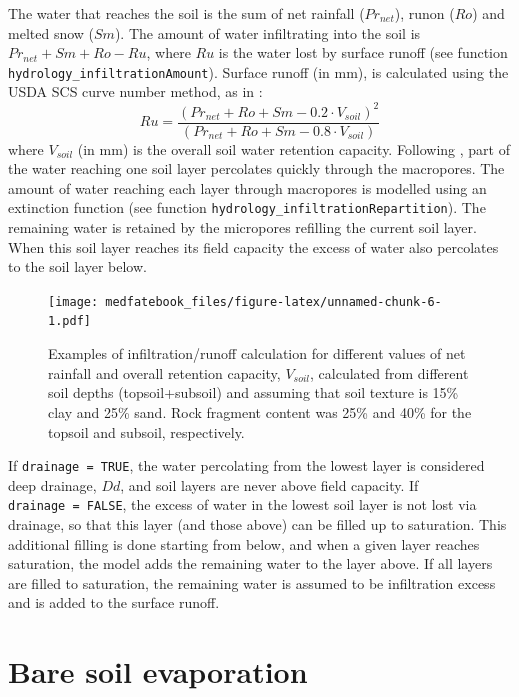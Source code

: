 \documentclass[]{book}
\begin{document}
The water that reaches the soil is the sum of net rainfall (\(Pr_{net}\)), runon (\(Ro\)) and melted snow (\(Sm\)). The amount of water infiltrating into the soil is \(Pr_{net} + Sm + Ro - Ru\), where \(Ru\) is the water lost by surface runoff (see function \texttt{hydrology\_infiltrationAmount}). Surface runoff (in mm), is calculated using the USDA SCS curve number method, as in \citet{Boughton1989}:
\begin{equation}
Ru=\frac{(Pr_{net} + Ro + Sm - 0.2 \cdot V_{soil})^2}{(Pr_{net} + Ro + Sm - 0.8 \cdot V_{soil})}
\end{equation}
where \(V_{soil}\) (in mm) is the overall soil water retention capacity. Following \citet{Granier1999}, part of the water reaching one soil layer percolates quickly through the macropores. The amount of water reaching each layer through macropores is modelled using an extinction function (see function \texttt{hydrology\_infiltrationRepartition}). The remaining water is retained by the micropores refilling the current soil layer. When this soil layer reaches its field capacity the excess of water also percolates to the soil layer below.

\begin{figure}
\centering
\texttt{[image: medfatebook\_files/figure-latex/unnamed-chunk-6-1.pdf]}
\caption{\label{fig:unnamed-chunk-6}Examples of infiltration/runoff calculation for different values of net rainfall and overall retention capacity, \(V_{soil}\), calculated from different soil depths (topsoil+subsoil) and assuming that soil texture is 15\% clay and 25\% sand. Rock fragment content was 25\% and 40\% for the topsoil and subsoil, respectively.}
\end{figure}

If \texttt{drainage\ =\ TRUE}, the water percolating from the lowest layer is considered deep drainage, \(Dd\), and soil layers are never above field capacity. If \texttt{drainage\ =\ FALSE}, the excess of water in the lowest soil layer is not lost via drainage, so that this layer (and those above) can be filled up to saturation. This additional filling is done starting from below, and when a given layer reaches saturation, the model adds the remaining water to the layer above. If all layers are filled to saturation, the remaining water is assumed to be infiltration excess and is added to the surface runoff.

\hypertarget{soilevaporation}{%
\section{Bare soil evaporation}\label{soilevaporation}}
\end{document}
